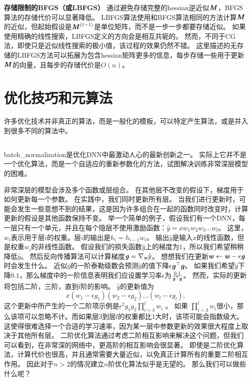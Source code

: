 \textbf{存储限制的\gls{BFGS}（或\gls{LBFGS}）}
通过避免存储完整的\gls{hessian}逆近似$\boldsymbol{\mathit{M}}$，\gls{BFGS}算法的存储代价可以显著降低。
\gls{LBFGS}算法使用和\gls{BFGS}算法相同的方法计算$\boldsymbol{\mathit{M}}$的近似，但起始假设是$\boldsymbol{\mathit{M}}^{(t-1)}$是单位矩阵，而不是一步一步都要存储近似。
如果使用精确的线性搜索，\gls{LBFGS}定义的方向会是相互共轭的。
然而，不同于\gls{CG}法，即使只是近似线性搜索的极小值，该过程的效果仍然不错。
这里描述的无存储的\gls{LBFGS}方法可以拓展为包含\gls{hessian}矩阵更多的信息，每步存储一些用于更新$\boldsymbol{\mathit{M}}$的向量，且每步的存储代价是$O(n)$。


\section{优化技巧和元算法}
\label{sec:optimization_strategies_and_meta_algorithms}
许多优化技术并非真正的算法，而是一般化的模板，可以特定产生算法，或是并入到很多不同的算法中。

\subsection{}
\label{sec:batch_normalization}
\gls{batch_normalization}\citep{Ioffe+Szegedy-2015}是优化\gls{DNN}中最激动人心的最新创新之一。
实际上它并不是一个优化算法，而是一个自适应的重新参数化的方法，试图解决训练非常深层模型的困难。

非常深层的模型会涉及多个函数或层组合。
在其他层不改变的假设下，梯度用于如何更新每一个参数。
在实践中，我们同时更新所有层。
当我们进行更新时，可能会发生一些意想不到的结果，这是因为许多组合在一起的函数同时改变时，计算更新的假设是其他函数保持不变。
举一个简单的例子，假设我们有一个\gls{DNN}，每一层只有一个单元，并且在每个隐层不使用激励函数：$\hat{y} = xw_1w_2w_3...w_l$。
这里，$w_i$表示用于层$i$的权重。层$i$的输出是$h_i = h_{i-1} w_i$。
输出$\hat{y}$是输入$x$的线性函数，但是权重$w_i$的非线性函数。
假设我们的损失函数$\hat{y}$上的梯度为$1$，所以我们希望稍稍降低$\hat{y}$。
然后反向传播算法可以计算梯度$\boldsymbol{\mathit{g}} = \nabla_{\boldsymbol{\mathit{w}}} \hat{y}$。
想想我们在更新$\boldsymbol{\mathit{w}} \leftarrow \boldsymbol{\mathit{w}} - \epsilon \boldsymbol{\mathit{g}}$时会发生什么。
近似$\hat{y}$的一阶泰勒级数会预测$\hat{y}$的值下降$\epsilon \boldsymbol{\mathit{g}}^\top \boldsymbol{\mathit{g}}$。
如果我们希望$\hat{y}$下降$0.1$，那么梯度中的一阶信息表明我们应设置学习率$\epsilon$为$\frac{0.1}{\boldsymbol{\mathit{g}}^\top \boldsymbol{\mathit{g}}}$。
然而，实际的更新将包括二阶，三阶，直到$l$阶的影响。
$\hat{y}$的更新值为
\begin{equation}
    x(w_1-\epsilon g_1)(w_2-\epsilon g_2)\dots(w_l-\epsilon g_l),
\end{equation}
这个更新中所产生的一个二阶项示例是$\epsilon^2 g_1 g_2 \prod_{i=3}^l w_i$ 。
如果 $\prod_{i=3}^l w_i$很小，那么该项可以忽略不计。而如果层$3$到层$l$的权重都比$1$大时，该项可能会指数级大。
这使得很难选择一个合适的学习速率，因为某一层中参数更新的效果很大程度上取决于其他所有层。
二阶优化算法通过考虑二阶相互影响来解决这个问题，但我们可以看到，在非常深的网络中，更高阶的相互影响会很显著。
即使是二阶优化算法，计算代价也很高，并且通常需要大量近似，以免真正计算所有的重要二阶相互作用。
因此对于$n>2$的情况建立$n$阶优化算法似乎是无望的。
那么我们可以做些什么呢？

